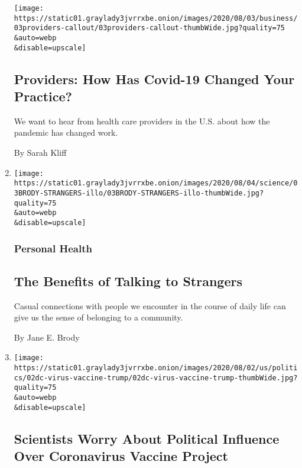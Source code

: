 \begin{enumerate}
  \texttt{[image: https://static01.graylady3jvrrxbe.onion/images/2020/08/03/business/03providers-callout/03providers-callout-thumbWide.jpg?quality=75\\\&auto=webp\\\&disable=upscale]}

  \hypertarget{providers-how-has-covid-19-changed-your-practice}{%
  \subsection{Providers: How Has Covid-19 Changed Your
  Practice?}\label{providers-how-has-covid-19-changed-your-practice}}

  We want to hear from health care providers in the U.S. about how the
  pandemic has changed work.

  By Sarah Kliff
\item
  \href{/2020/08/03/well/family/the-benefits-of-talking-to-strangers.html}{}

  \texttt{[image: https://static01.graylady3jvrrxbe.onion/images/2020/08/04/science/03BRODY-STRANGERS-illo/03BRODY-STRANGERS-illo-thumbWide.jpg?quality=75\\\&auto=webp\\\&disable=upscale]}

  \hypertarget{personal-health}{%
  \subsubsection{Personal Health}\label{personal-health}}

  \hypertarget{the-benefits-of-talking-to-strangers-1}{%
  \subsection{The Benefits of Talking to
  Strangers}\label{the-benefits-of-talking-to-strangers-1}}

  Casual connections with people we encounter in the course of daily
  life can give us the sense of belonging to a community.

  By Jane E. Brody
\item
  \href{/2020/08/02/us/politics/coronavirus-vaccine.html}{}

  \texttt{[image: https://static01.graylady3jvrrxbe.onion/images/2020/08/02/us/politics/02dc-virus-vaccine-trump/02dc-virus-vaccine-trump-thumbWide.jpg?quality=75\\\&auto=webp\\\&disable=upscale]}

  \hypertarget{scientists-worry-about-political-influence-over-coronavirus-vaccine-project}{%
  \subsection{Scientists Worry About Political Influence Over
  Coronavirus Vaccine
  Project}\label{scientists-worry-about-political-influence-over-coronavirus-vaccine-project}}


\end{enumerate}
